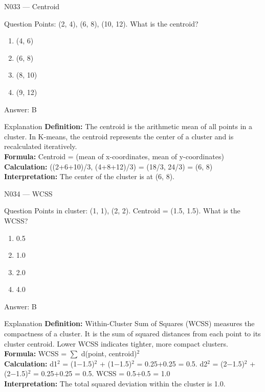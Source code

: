 \documentclass[aspectratio=169,8pt]{beamer}
\begin{document}
	\begin{frame}{N033 --- Centroid}
		\begin{block}{Question}
			Points: (2, 4), (6, 8), (10, 12). What is the centroid?
			\begin{enumerate}
				\item (4, 6)
				\item (6, 8)
				\item (8, 10)
				\item (9, 12)
			\end{enumerate}
		\end{block}
		\begin{exampleblock}{Answer: B}\end{exampleblock}
		\begin{block}{Explanation}
			\textbf{Definition:} The centroid is the arithmetic mean of all points in a cluster. In K-means, the centroid represents the center of a cluster and is recalculated iteratively.\\
			\textbf{Formula:} Centroid = (mean of x-coordinates, mean of y-coordinates)\\
			\textbf{Calculation:} ((2+6+10)/3, (4+8+12)/3) = (18/3, 24/3) = (6, 8)\\
			\textbf{Interpretation:} The center of the cluster is at (6, 8).
		\end{block}
	\end{frame}
	
	\begin{frame}{N034 --- WCSS}
		\begin{block}{Question}
			Points in cluster: (1, 1), (2, 2). Centroid = (1.5, 1.5). What is the WCSS?
			\begin{enumerate}
				\item 0.5
				\item 1.0
				\item 2.0
				\item 4.0
			\end{enumerate}
		\end{block}
		\begin{exampleblock}{Answer: B}\end{exampleblock}
		\begin{block}{Explanation}
			\textbf{Definition:} Within-Cluster Sum of Squares (WCSS) measures the compactness of a cluster. It is the sum of squared distances from each point to its cluster centroid. Lower WCSS indicates tighter, more compact clusters.\\
			\textbf{Formula:} WCSS = $\sum$ d(point, centroid)$^{2}$\\
			\textbf{Calculation:} d1$^{2}$ = (1$-$1.5)$^{2}$ + (1$-$1.5)$^{2}$ = 0.25+0.25 = 0.5. d2$^{2}$ = (2$-$1.5)$^{2}$ + (2$-$1.5)$^{2}$ = 0.25+0.25 = 0.5. WCSS = 0.5+0.5 = 1.0\\
			\textbf{Interpretation:} The total squared deviation within the cluster is 1.0.
		\end{block}
	\end{frame}
	
\end{document}
